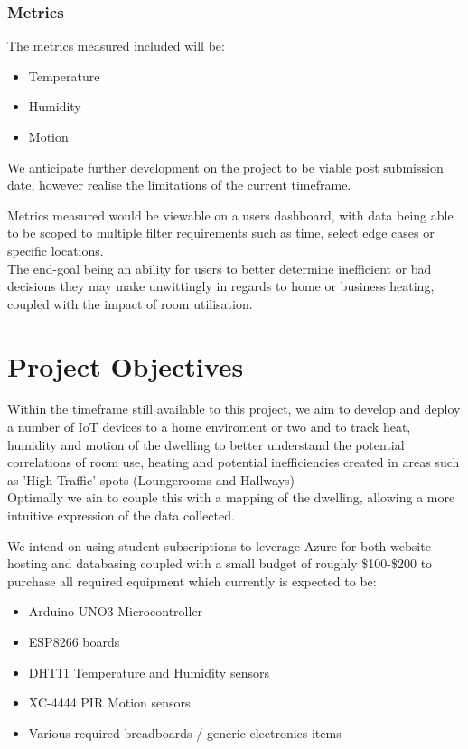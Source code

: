 \documentclass{article}
\begin{document}
            \subsubsection{Metrics}
                The metrics measured included will be: 
                \begin{itemize}
                    \item Temperature
                    \item Humidity
                    \item Motion
                \end{itemize}
                We anticipate further development on the project to be viable post submission date,
                however realise the limitations of the current timeframe.
                \par
                Metrics measured would be viewable on a users dashboard, with data being able to be
                scoped to multiple filter requirements such as time, select edge cases or specific 
                locations.
                \\
                The end-goal being an ability for users to better determine inefficient or bad decisions
                they may make unwittingly in regards to home or business heating, coupled with the 
                impact of room utilisation.

    \newpage

    \section{Project Objectives}
        Within the timeframe still available to this project, we aim to develop and deploy a number of 
        IoT devices\cite{ESP8266} to a home enviroment or two and to track heat, humidity and motion of the
        dwelling to better understand the potential correlations of room use, heating and potential 
        inefficiencies created in areas such as 'High Traffic' spots (Loungerooms and Hallways)
        \\
        Optimally we ain to couple this with a mapping of the dwelling, allowing a more intuitive expression 
        of the data collected.
        \par
        We intend on using student subscriptions to leverage Azure for both website hosting and databasing 
        coupled with a small budget of roughly \$100-\$200 to purchase all required equipment which currently
        is expected to be:
        \begin{itemize}
            \item Arduino UNO3 Microcontroller
            \item ESP8266 boards
            \item DHT11 Temperature and Humidity sensors\cite{DHT11}
            \item XC-4444 PIR Motion sensors\cite{XC-4444}
            \item Various required breadboards / generic electronics items
        \end{itemize}
\end{document}
